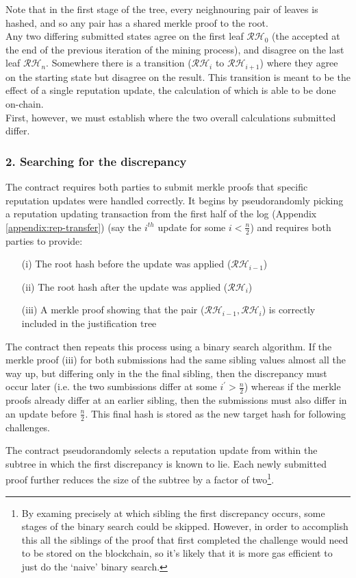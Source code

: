Note that in the first stage of the tree, every neighnouring pair of leaves is hashed, and so any pair has a shared merkle proof to the root.\\
Any two differing submitted states agree on the first leaf $\mathcal{RH}_0$ (the  accepted at the end of the previous iteration of the mining process), and disagree on the last leaf $\mathcal{RH}_n$. Somewhere there is a transition  ($\mathcal{RH}_i$ to $\mathcal{RH}_{i+1}$) where they agree on the starting state but disagree on the result. This transition is meant to be the effect of a single reputation update, the calculation of which is able to be done on-chain. \\
First, however, we must establish where the two overall calculations submitted differ.

\subsubsection*{2. Searching for the discrepancy}
The contract requires both parties to submit merkle proofs that specific reputation updates were handled correctly. It begins by pseudorandomly picking a reputation updating transaction from the first half of the log (Appendix \ref{appendix:rep-transfer}) (say the $i^{th}$ update for some $i<\frac{n}{2}$) and requires both parties to provide:\\
\begin{itemize}
 \item[(i)] The root hash before the update was applied ($\mathcal{RH}_{i-1}$)
 \item[(ii)] The root hash after the update was applied ($\mathcal{RH}_i$)
 \item[(iii)] A merkle proof showing that the pair ($\mathcal{RH}_{i-1}, \mathcal{RH}_i$) is correctly included in the justification tree
\end{itemize}

The contract then repeats this process using a binary search algorithm. If the merkle proof (iii) for both submissions had the same sibling values almost all the way up, but differing only in the the final sibling, then the discrepancy must occur later (i.e. the two sumbissions differ at some $i^\prime > \frac{n}{2}$) whereas if the merkle proofs already differ at an earlier sibling, then the submissions must also differ in an update before $\frac{n}{2}$. This final hash is stored as the new target hash for following challenges.

The contract pseudorandomly selects a reputation update from within the subtree in which the first discrepancy is known to lie. Each newly submitted proof further reduces the size of the subtree by a factor of two\footnote{ By examing precisely at which sibling the first discrepancy occurs, some stages of the binary search could be skipped. However, in order to accomplish this all the siblings of the proof that first completed the challenge would need to be stored on the blockchain, so it’s likely that it is more gas efficient to just do the `naive' binary search.}.

